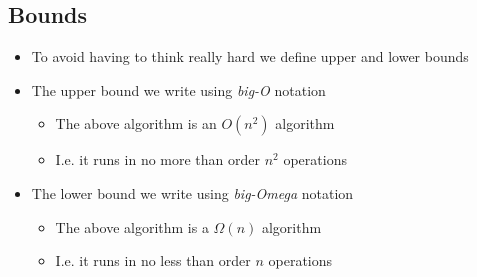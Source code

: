 
\begin{slide}
\section{Bounds}

\begin{PauseHighLight}
  \begin{itemize}
  \item To avoid having to think really hard we define upper and lower
    bounds\pause
  \item The upper bound we write using \emph{big-O} notation
    \begin{itemize}
    \item The above algorithm is an $O(n^2)$ algorithm
    \item I.e. it runs in no more than order $n^2$ operations
    \end{itemize}\pause
  \item The lower bound we write using \emph{big-Omega} notation
    \begin{itemize}
    \item The above algorithm is a $\Omega(n)$ algorithm
    \item I.e. it runs in no less than order $n$ operations
    \end{itemize}\pause
  \end{itemize}
\end{PauseHighLight}

\end{slide}



